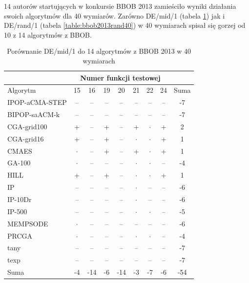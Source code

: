 \documentclass[a4paper,onecolumn,oneside,12pt,wide,floatssmall]{mwrep}
\theoremstyle{definition}
\theoremstyle{plain}%
\theoremstyle{remark}
\begin{document}
14 autorów startujących w konkursie BBOB 2013 zamieściło wyniki działania
swoich algorytmów dla 40 wymiarów.
Zarówno DE/mid/1 (tabela \ref{table:bbob2013mid40}) 
jak i DE/rand/1 (tabela \ref{table:bbob2013rand40}) 
w 40 wymiarach spisał się gorzej od 10 z 14 algorytmów z BBOB.

\begin{table}[H]
\centering
\begin{tabular}{ | l | c | c | c | c | c | c | c | c | }
\hline		 & \multicolumn{7}{c|}{Numer funkcji testowej} & \\  \hline
Algorytm         &15& 16& 19& 20& 21& 22& 24 & Suma \\  \hline
IPOP-aCMA-STEP	 & -- & -- & -- & -- & -- & -- & -- & -7\\
BIPOP-saACM-k	 & -- & -- & -- & -- & -- & -- & -- & -7\\
CGA-grid100	 & + & -- & + & -- & + & $\cdot$ & + & 2 \\
CGA-grid16	 & + & -- & + & -- & $\cdot$ & $\cdot$ & + & 1 \\
CMAES	 & $\cdot$ & -- & + & -- & + & $\cdot$ & + & 1  \\
GA-100	 & $\cdot$ & -- & -- & -- & $\cdot$ & $\cdot$ & -- & -4 \\
HILL	 & + & -- & + & -- & $\cdot$ & $\cdot$ & + & 1\\
IP	 & -- & -- & -- & -- & $\cdot$ & -- & -- & -6 \\
IP-10Dr	 & -- & -- & -- & -- & $\cdot$ & -- & -- & -6 \\
IP-500	 & -- & -- & -- & -- & $\cdot$ & $\cdot$ & -- & -5 \\
MEMPSODE	 & $\cdot$ & -- & -- & -- & -- & -- & -- & -6 \\
PRCGA	 & $\cdot$ & -- & -- & -- & $\cdot$ & $\cdot$ & -- & -4 \\
tany	 & -- & -- & -- & -- & -- & -- & -- & -7 \\
texp	 & -- & -- & -- & -- & -- & -- & -- & -7 \\ \hline
Suma	 & -4 & -14 & -6 & -14& -3 & -7 & -6 & -54 \\ \hline
\end{tabular}
\caption{Porównanie DE/mid/1 do 14 algorytmów z BBOB 2013 w 40 wymiarach}
\label{table:bbob2013mid40}
\end{table}
\end{document}
